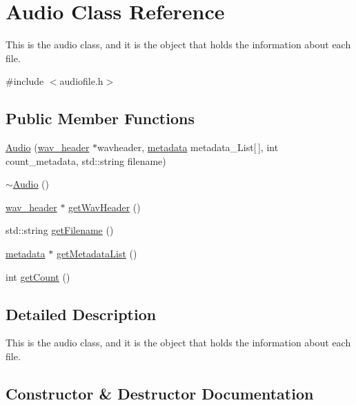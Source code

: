\hypertarget{classAudio}{}\section{Audio Class Reference}
\label{classAudio}


This is the audio class, and it is the object that holds the information about each file.  




{\ttfamily \#include $<$audiofile.\+h$>$}

\subsection*{Public Member Functions}
\begin{DoxyCompactItemize}
\item 
\hyperlink{classAudio_a219fef2857b36e3c0b4d04e1ec5d5927}{Audio} (\hyperlink{structwav__header}{wav\+\_\+header} $\ast$wavheader, \hyperlink{structmetadata}{metadata} metadata\+\_\+\+List\mbox{[}$\,$\mbox{]}, int count\+\_\+metadata, std\+::string filename)
\item 
\hyperlink{classAudio_ae8f54deecb5f48511aaab469e80294d6}{$\sim$\+Audio} ()
\item 
\hyperlink{structwav__header}{wav\+\_\+header} $\ast$ \hyperlink{classAudio_ac0c6115c2102ec602cdc99dc9929fb86}{get\+Wav\+Header} ()
\item 
std\+::string \hyperlink{classAudio_a33b723e5b540b84b1d7fcd59d0eee567}{get\+Filename} ()
\item 
\hyperlink{structmetadata}{metadata} $\ast$ \hyperlink{classAudio_a6da23521eb58061da65ac88823b875e6}{get\+Metadata\+List} ()
\item 
int \hyperlink{classAudio_acd1ab84a9b985a1792238313d9fc3448}{get\+Count} ()
\end{DoxyCompactItemize}


\subsection{Detailed Description}
This is the audio class, and it is the object that holds the information about each file. 

\subsection{Constructor \& Destructor Documentation}
\mbox{\label{classAudio_a219fef2857b36e3c0b4d04e1ec5d5927}} 
